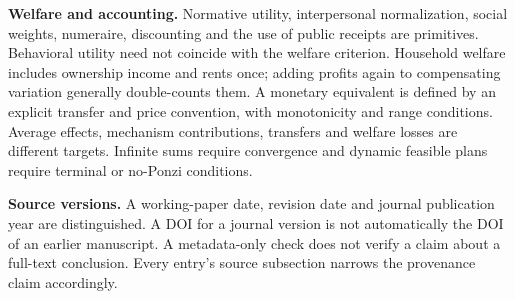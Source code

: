 \documentclass[11pt,a4paper]{article}
\begin{document}
\textbf{Welfare and accounting.} Normative utility, interpersonal normalization, social weights, numeraire, discounting and the use of public receipts are primitives. Behavioral utility need not coincide with the welfare criterion. Household welfare includes ownership income and rents once; adding profits again to compensating variation generally double-counts them. A monetary equivalent is defined by an explicit transfer and price convention, with monotonicity and range conditions. Average effects, mechanism contributions, transfers and welfare losses are different targets. Infinite sums require convergence and dynamic feasible plans require terminal or no-Ponzi conditions.

\textbf{Source versions.} A working-paper date, revision date and journal publication year are distinguished. A DOI for a journal version is not automatically the DOI of an earlier manuscript. A metadata-only check does not verify a claim about a full-text conclusion. Every entry's source subsection narrows the provenance claim accordingly.
\end{document}
